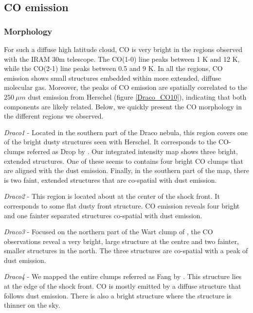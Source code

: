 \documentclass[traditabstract]{aa}
\begin{document}
   \subsection{CO emission}

      \subsubsection{Morphology}

   For such a diffuse high latitude cloud, CO is very bright in the regions observed with the IRAM 30m telescope. The CO(1-0) line peaks between 1 K and 12 K, while the CO(2-1) line peaks between 0.5 and 9 K. In all the regions, CO emission shows small structures embedded within more extended, diffuse molecular gas. Moreover, the peaks of CO emission are spatially correlated to the $250\: \mu m$ dust emission from Herschel (figure \ref{Draco_CO10}), indicating that both components are likely related. Below, we quickly present the CO morphology in the different regions we observed.
\medskip

\noindent \textit{Draco1} - Located in the southern part of the Draco nebula, this region covers one of the bright dusty structures seen with Herschel. It corresponds to the CO-clumps referred as Drop by \cite{Mebold_1985}. Our integrated intensity map shows three bright, extended structures. One of these seems to contains four bright CO clumps that are aligned with the dust emission. Finally, in the southern part of the map, there is two faint, extended structures that are co-spatial with dust emission.
\medskip

\noindent \textit{Draco2} - This region is located about at the center of the shock front. It corresponds to some flat dusty front structure. CO emission reveals four bright and one fainter separated structures co-spatial with dust emission.
\medskip

\noindent \textit{Draco3} - Focused on the northern part of the Wart clump of \cite{Mebold_1985}, the CO observations reveal a very bright, large structure at the centre and two fainter, smaller structures in the north. The three structures are co-spatial with a peak of dust emission.
\medskip

\noindent \textit{Draco4} - We mapped the entire clumps referred as Fang by \cite{Mebold_1985}. This structure lies at the edge of the shock front. CO is mostly emitted by a diffuse structure that follows dust emission. There is also a bright structure where the structure is thinner on the sky.
\medskip
\end{document}
